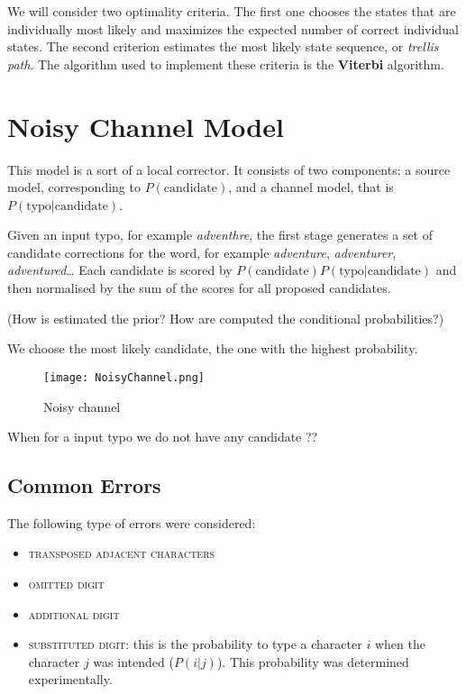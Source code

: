We will consider two optimality criteria. The first one chooses the states that are individually most likely and maximizes the 
expected number of correct individual states. The second criterion estimates the most likely state sequence, or 
\textit{trellis path}. The algorithm used to implement these criteria is the \textbf{Viterbi} algorithm. %

\section{Noisy Channel Model}

This model is a sort of a local corrector. It consists of two components: a source model, corresponding to 
$P(\text{candidate})$, and a channel model, 
that is $P(\text{typo}|\text{candidate})$.


Given an input typo, for example \textsl{adventhre}, the first stage generates a set of candidate corrections for the word, 
for example \textsl{adventure}, \textsl{adventurer}, \textsl{adventured}…
Each candidate is scored by $P(\text{candidate})P(\text{typo}|\text{candidate})$ and then normalised by the sum of the 
scores for all proposed candidates.

(How is estimated the prior? How are computed the conditional probabilities?)%

We choose the most likely candidate, the one with the highest probability.

\begin{figure}[H]
	\centering
	\texttt{[image: NoisyChannel.png]}
	\caption{Noisy channel}
	\label{fig:noisychannel}
\end{figure}

When for a input typo we do not have any candidate ?? %


\subsection{Common Errors}
The following type of errors were considered:
\begin{itemize}
	\item \textsc{transposed adjacent characters}
	\item \textsc{omitted digit}
	\item \textsc{additional digit}
	\item \textsc{substituted digit}: this is the probability to type a
	character $i$ when the character $j$ was intended ($P(i|j)$). This 
	probability was determined experimentally. %
\end{itemize}

